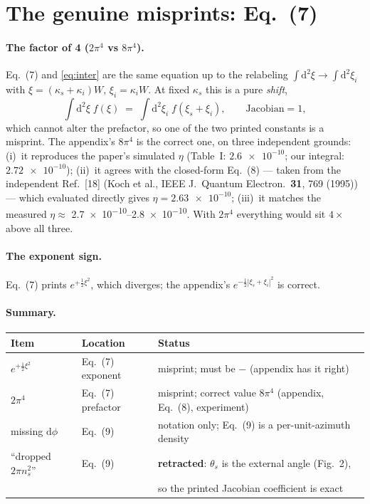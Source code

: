 \documentclass[11pt]{article}
\newcommand{\dd}{\mathrm{d}}
\begin{document}
\section*{The genuine misprints: Eq.~(7)}

\paragraph{The factor of 4 ($2\pi^4$ vs $8\pi^4$).}
Eq.~(7) and \eqref{eq:inter} are the same equation up to the relabeling
$\int\dd^2\xi \to \int\dd^2\xi_i$ with $\xi=(\kappa_s+\kappa_i)W$,
$\xi_i=\kappa_i W$. At fixed $\kappa_s$ this is a pure \emph{shift},
\begin{equation}
\int \dd^2\xi\; f(\xi) \;=\; \int \dd^2\xi_i\; f(\xi_s+\xi_i),
\qquad \text{Jacobian}=1,
\end{equation}
which cannot alter the prefactor, so one of the two printed constants is a
misprint. The appendix's $8\pi^4$ is the correct one, on three independent
grounds: (i)~it reproduces the paper's simulated $\eta$
(Table~I: $\num{2.6e-10}$; our integral: $\num{2.72e-10}$);
(ii)~it agrees with the closed-form Eq.~(8) --- taken from the independent
Ref.~[18] (Koch et al., IEEE J.\ Quantum Electron.\ \textbf{31}, 769 (1995))
--- which evaluated directly gives $\eta = \num{2.63e-10}$;
(iii)~it matches the measured $\eta \approx$ \numrange{2.7e-10}{2.8e-10}.
With $2\pi^4$ everything would sit $4\times$ above all three.

\paragraph{The exponent sign.}
Eq.~(7) prints $e^{+\frac12\xi^2}$, which diverges; the appendix's
$e^{-\frac12|\xi_s+\xi_i|^2}$ is correct.

\paragraph{Summary.}
\begin{center}
\begin{tabular}{lll}
\hline
Item & Location & Status\\
\hline
$e^{+\frac12\xi^2}$ & Eq.~(7) exponent & misprint; must be $-$ (appendix has it right)\\
$2\pi^4$ & Eq.~(7) prefactor & misprint; correct value $8\pi^4$ (appendix, Eq.~(8), experiment)\\
missing $\dd\phi$ & Eq.~(9) & notation only; Eq.~(9) is a per-unit-azimuth density\\
``dropped $2\pi n_s^2$'' & Eq.~(9) & \textbf{retracted}: $\theta_s$ is the external angle (Fig.~2),\\
& & so the printed Jacobian coefficient is exact\\
\hline
\end{tabular}
\end{center}
\end{document}
